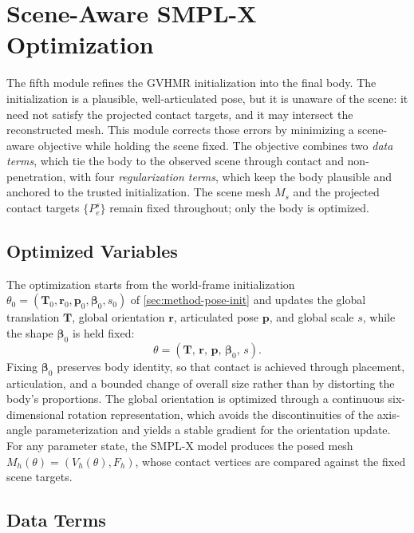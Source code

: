 \section{Scene-Aware SMPL-X Optimization}
\label{sec:method-optimization}

The fifth module refines the GVHMR initialization into the final body. The initialization is a plausible, well-articulated pose, but it is unaware of the scene: it need not satisfy the projected contact targets, and it may intersect the reconstructed mesh. This module corrects those errors by minimizing a scene-aware objective while holding the scene fixed. The objective combines two \emph{data terms}, which tie the body to the observed scene through contact and non-penetration, with four \emph{regularization terms}, which keep the body plausible and anchored to the trusted initialization. The scene mesh $M_s$ and the projected contact targets $\{P_e^s\}$ remain fixed throughout; only the body is optimized.

\subsection{Optimized Variables}
\label{sec:method-optimized-variables}

The optimization starts from the world-frame initialization $\theta_0 = (\mathbf{T}_0, \mathbf{r}_0, \mathbf{p}_0, \boldsymbol{\beta}_0, s_0)$ of \cref{sec:method-pose-init} and updates the global translation $\mathbf{T}$, global orientation $\mathbf{r}$, articulated pose $\mathbf{p}$, and global scale $s$, while the shape $\boldsymbol{\beta}_0$ is held fixed:
\begin{equation}
\label{eq:optimized-theta}
\theta = (\mathbf{T},\, \mathbf{r},\, \mathbf{p},\, \boldsymbol{\beta}_0,\, s).
\end{equation}
Fixing $\boldsymbol{\beta}_0$ preserves body identity, so that contact is achieved through placement, articulation, and a bounded change of overall size rather than by distorting the body's proportions. The global orientation is optimized through a continuous six-dimensional rotation representation, which avoids the discontinuities of the axis-angle parameterization and yields a stable gradient for the orientation update. For any parameter state, the SMPL-X model produces the posed mesh $M_h(\theta) = (V_h(\theta), F_h)$, whose contact vertices are compared against the fixed scene targets.

\subsection{Data Terms}
\label{sec:method-data-terms}

